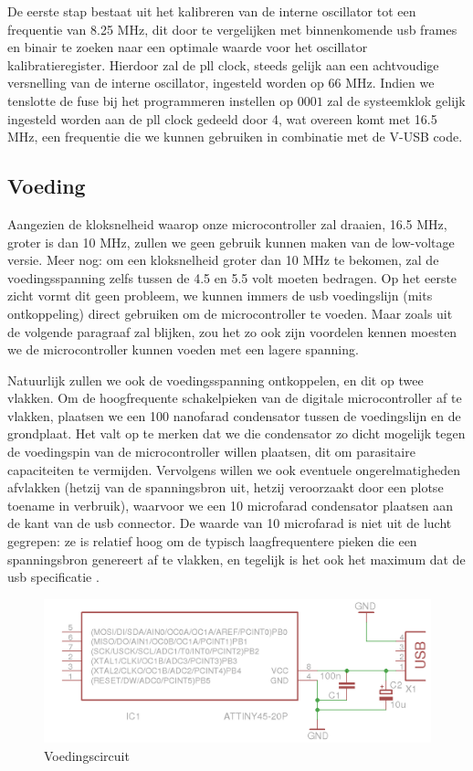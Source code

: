 \documentclass[verslag.tex]{subfiles}
\begin{document}
De eerste stap bestaat uit het kalibreren van de interne oscillator tot een frequentie van 8.25 MHz, dit door te vergelijken met binnenkomende \ac{usb} frames en binair te zoeken naar een optimale waarde voor het  oscillator kalibratieregister. Hierdoor zal de \ac{pll} clock, steeds gelijk aan een achtvoudige versnelling van de interne oscillator, ingesteld worden op 66 MHz. Indien we tenslotte de  fuse bij het programmeren instellen op $0001$ zal de systeemklok gelijk ingesteld worden aan de \ac{pll} clock gedeeld door 4, wat overeen komt met 16.5 MHz, een frequentie die we kunnen gebruiken in combinatie met de V-USB code.

\subsection{Voeding}

Aangezien de kloksnelheid waarop onze microcontroller zal draaien, 16.5 MHz, groter is dan 10 MHz, zullen we geen gebruik kunnen maken van de low-voltage versie. Meer nog: om een kloksnelheid groter dan 10 MHz te bekomen, zal de voedingsspanning zelfs tussen de 4.5 en 5.5 volt moeten bedragen. Op het eerste zicht vormt dit geen probleem, we kunnen immers de \ac{usb} voedingslijn (mits ontkoppeling) direct gebruiken om de microcontroller te voeden. Maar zoals uit de volgende paragraaf zal blijken, zou het zo ook zijn voordelen kennen moesten we de microcontroller kunnen voeden met een lagere spanning.

Natuurlijk zullen we ook de voedingsspanning ontkoppelen, en dit op twee vlakken. Om de hoogfrequente schakelpieken van de digitale microcontroller af te vlakken, plaatsen we een 100 nanofarad condensator tussen de voedingslijn en de grondplaat. Het valt op te merken dat we die condensator zo dicht mogelijk tegen de voedingspin van de microcontroller willen plaatsen, dit om parasitaire capaciteiten te vermijden. Vervolgens willen we ook eventuele ongerelmatigheden afvlakken (hetzij van de spanningsbron uit, hetzij veroorzaakt door een plotse toename in verbruik), waarvoor we een 10 microfarad condensator plaatsen aan de kant van de \ac{usb} connector. De waarde van 10 microfarad is niet uit de lucht gegrepen: ze is relatief hoog om de typisch laagfrequentere pieken die een spanningsbron genereert af te vlakken, en tegelijk is het ook het maximum dat de \ac{usb} specificatie .

\begin{figure}
	\includegraphics[width=\textwidth]{afbeeldingen/circuit_voeding}
	\caption{Voedingscircuit}
\end{figure}
\end{document}
